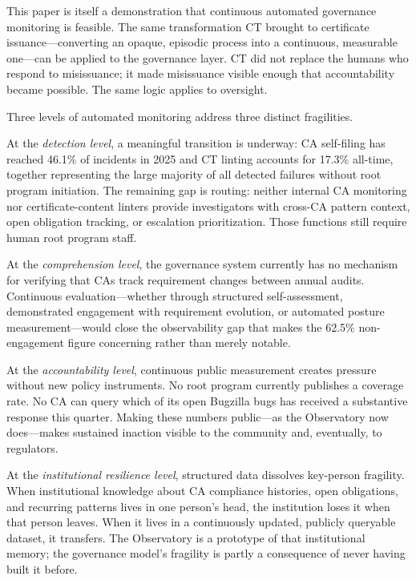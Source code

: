 \documentclass[10pt,twocolumn,letterpaper]{article}
\begin{document}
This paper is itself a demonstration that continuous automated governance
monitoring is feasible. The same transformation CT brought to certificate
issuance---converting an opaque, episodic process into a continuous,
measurable one---can be applied to the governance layer. CT did not replace
the humans who respond to misissuance; it made misissuance visible enough
that accountability became possible. The same logic applies to oversight.

Three levels of automated monitoring address three distinct fragilities.

At the \textit{detection level}, a meaningful transition is underway:
CA self-filing has reached 46.1\% of incidents in 2025 and CT linting
accounts for 17.3\% all-time, together representing the large majority
of all detected failures without root program initiation. The remaining
gap is routing: neither internal CA monitoring nor certificate-content
linters provide investigators with cross-CA pattern context, open
obligation tracking, or escalation prioritization. Those functions
still require human root program staff.

At the \textit{comprehension level}, the governance system currently has
no mechanism for verifying that CAs track requirement changes between
annual audits. Continuous evaluation---whether through structured
self-assessment, demonstrated engagement with requirement evolution, or
automated posture measurement---would close the observability gap that
makes the 62.5\% non-engagement figure concerning rather than merely
notable.

At the \textit{accountability level}, continuous public measurement creates
pressure without new policy instruments. No root program currently publishes
a coverage rate. No CA can query which of its open Bugzilla bugs has received
a substantive response this quarter. Making these numbers public---as the
Observatory now does---makes sustained inaction visible to the community
and, eventually, to regulators.

At the \textit{institutional resilience level}, structured data dissolves
key-person fragility. When institutional knowledge about CA compliance
histories, open obligations, and recurring patterns lives in one person's
head, the institution loses it when that person leaves. When it lives in
a continuously updated, publicly queryable dataset, it transfers. The
Observatory is a prototype of that institutional memory; the governance
model's fragility is partly a consequence of never having built it before.
\end{document}
